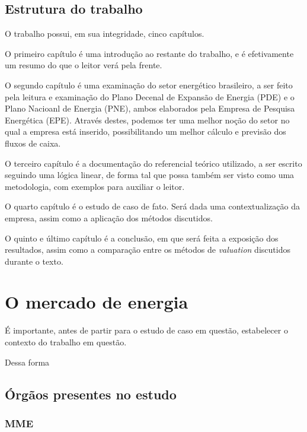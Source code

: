 \documentclass[grad,numbers]{coppe}
\begin{document}
  \hypertarget{estrutura-do-trabalho}{%
  \section{Estrutura do trabalho}\label{estrutura-do-trabalho}}
  
  O trabalho possui, em sua integridade, cinco capítulos.
  
  O primeiro capítulo é uma introdução ao restante do trabalho, e é efetivamente um resumo do que o leitor verá pela frente.
  
  O segundo capítulo é uma examinação do setor energético brasileiro, a ser feito pela leitura e examinação do Plano Decenal de Expansão de Energia (PDE) e o Plano Nacioanl de Energia (PNE), ambos elaborados pela Empresa de Pesquisa Energética (EPE). Através destes, podemos ter uma melhor noção do setor no qual a empresa está inserido, possibilitando um melhor cálculo e previsão dos fluxos de caixa.
  
  O terceiro capítulo é a documentação do referencial teórico utilizado, a ser escrito seguindo uma lógica linear, de forma tal que possa também ser visto como uma metodologia, com exemplos para auxiliar o leitor.
  
  O quarto capítulo é o estudo de caso de fato. Será dada uma contextualização da empresa, assim como a aplicação dos métodos discutidos.
  
  O quinto e último capítulo é a conclusão, em que será feita a exposição dos resultados, assim como a comparação entre os métodos de \emph{valuation} discutidos durante o texto.
  
  \hypertarget{o-mercado-de-energia}{%
  \chapter{O mercado de energia}\label{o-mercado-de-energia}}
  
  É importante, antes de partir para o estudo de caso em questão, estabelecer o contexto do trabalho em questão.
  
  Dessa forma
  
  \hypertarget{uxf3rguxe3os-presentes-no-estudo}{%
  \section{Órgãos presentes no estudo}\label{uxf3rguxe3os-presentes-no-estudo}}
  
  \hypertarget{mme}{%
  \subsection{MME}\label{mme}}
  
\end{document}
